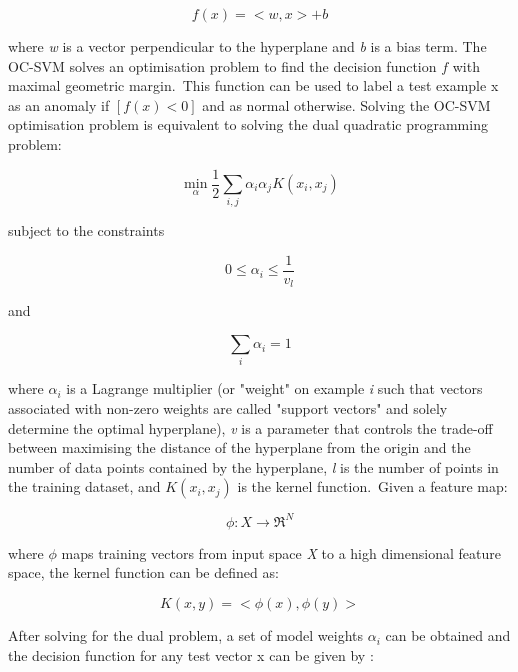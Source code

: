 			\begin{equation}
				f(x) = <w,x> +b
			\end{equation}
			
			where \textit{w} is a vector perpendicular to the hyperplane and \textit{b} is a bias term. The OC-SVM solves an optimisation problem to find the decision function $f$ with maximal geometric margin.\ This function can be used to label a test example x as an anomaly if $[f(x)<0]$ and as normal otherwise. Solving the OC-SVM optimisation problem is equivalent to solving the dual quadratic programming problem:

			\begin{equation}
				\min_{\alpha} \frac{1}{2}\sum_{i,j}\alpha_{i}\alpha_{j}K(x_{i},x_{j})
			\end{equation}

			subject to the constraints

			\begin{equation}
				0 \leq \alpha_{i} \leq \frac{1}{v_{l}}
			\end{equation}
			
			and 
		
			\begin{equation}
				\sum_{i}\alpha_{i}=1
			\end{equation}

			where $\alpha_{i}$ is a Lagrange multiplier (or "weight" on example \textit{i} such that vectors associated with non-zero weights are called "support vectors" and solely determine the optimal hyperplane), \textit{v} is a parameter that controls the trade-off between maximising the distance of the hyperplane from the origin and the number of data points contained by the hyperplane, \textit{l} is the number of points in the training dataset, and $K(x_{i},x_{j})$ is the kernel function.\ Given a feature map:

			\begin{equation}
				\phi: X \longrightarrow \Re^{N}
			\end{equation}

			where $\phi$ maps training vectors from input space \textit{X} to a high dimensional feature space, the kernel function can be defined as:

			\begin{equation}
				K(x,y) = <\phi(x),\phi(y)>
			\end{equation}

			After solving for the dual problem, a set of model weights $\alpha_{i}$ can be obtained and the decision function for any test vector x can be given by :


